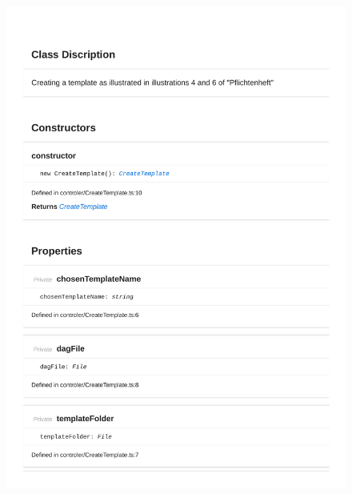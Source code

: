 \begin{figure}[H]
\centerline{\includegraphics[width=1\textwidth]{FrontendDocsAsPDF/Model/CreateTemplate.pdf}}

\end{figure}

